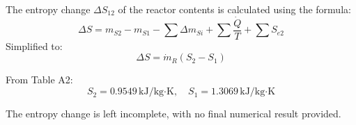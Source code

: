 The entropy change \( \Delta S_{12} \) of the reactor contents is calculated using the formula:  
\[
\Delta S = m_{S2} - m_{S1} - \sum \Delta m_{Si} + \sum \frac{\dot{Q}}{T} + \sum S_{e2}
\]  
Simplified to:  
\[
\Delta S = \dot{m}_{R} \left( S_{2} - S_{1} \right)
\]  

From Table A2:  
\[
S_{2} = 0.9549 \, \text{kJ/kg·K}, \quad S_{1} = 1.3069 \, \text{kJ/kg·K}
\]  

The entropy change is left incomplete, with no final numerical result provided.